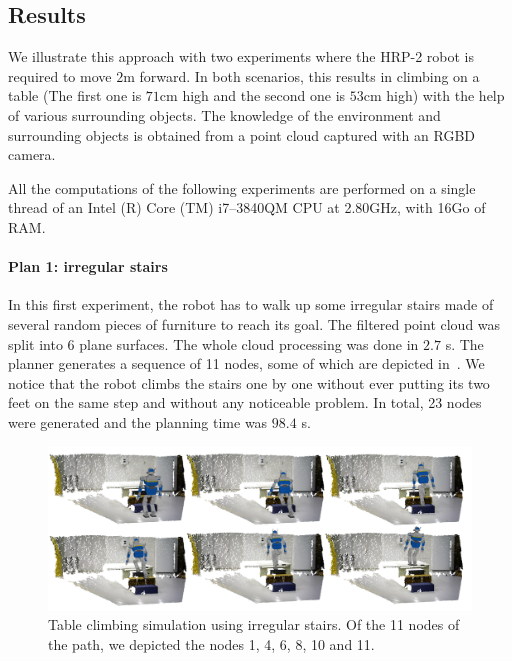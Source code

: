 \subsection{Results}
\label{sub:results_pcl_plannif}

We illustrate this approach with two experiments where the HRP-2 robot is required to move $2$m forward.
In both scenarios, this results in climbing on a table (The first one is $71$cm high and the second one is $53$cm high) with the help of various surrounding objects.
The knowledge of the environment and surrounding objects is obtained from a point cloud captured with an RGBD camera.

All the computations of the following experiments are performed on a single thread of an Intel (R) Core (TM) i7--3840QM CPU at 2.80GHz, with 16Go of RAM\@.

\paragraph{Plan 1: irregular stairs}
In this first experiment, the robot has to walk up some irregular stairs made of several random pieces of furniture to reach its goal.
The filtered point cloud was split into 6 plane surfaces.
The whole cloud processing was done in $2.7$ s.
The planner generates a sequence of 11 nodes, some of which are depicted in~.
We notice that the robot climbs the stairs one by one without ever putting its two feet on the same step and without any noticeable problem.
In total, 23 nodes were generated and the planning time was $98.4$ s.

\begin{figure}
  \centering
  \includegraphics[width=\linewidth]{hrp2stairs.png}
  \caption{Table climbing simulation using irregular stairs. Of the 11 nodes of the path, we depicted the nodes 1, 4, 6, 8, 10 and 11.}
\label{fig:table-climbing-simulation-stair}
\end{figure}

